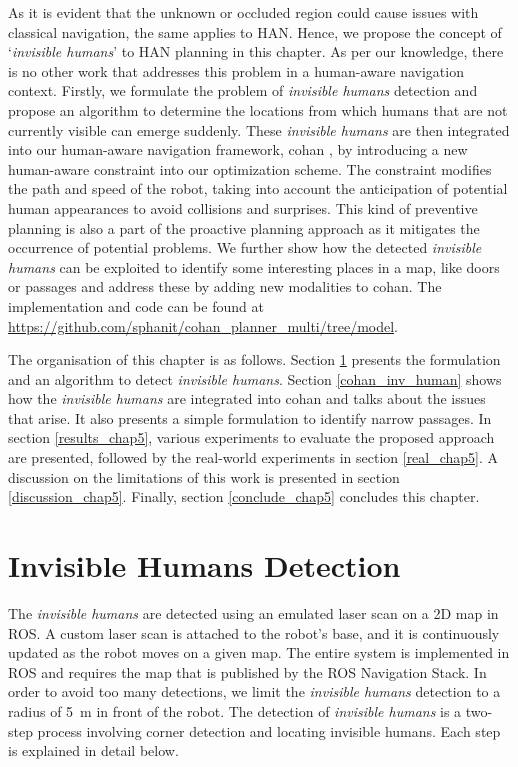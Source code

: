 As it is evident that the unknown or occluded region could cause issues with classical navigation, the same applies to HAN. Hence, we propose the concept of `\textit{invisible humans}' to HAN planning in this chapter. As per our knowledge, there is no other work that addresses this problem in a human-aware navigation context. Firstly, we formulate the problem of \textit{invisible humans} detection and propose an algorithm to determine the locations from which humans that are not currently visible can emerge suddenly. These \textit{invisible humans} are then integrated into our human-aware navigation framework, \acrshort{cohan} \cite{singamaneni2021human}, by introducing a new human-aware constraint into our optimization scheme. The constraint modifies the path and speed of the robot, taking into account the anticipation of potential human appearances to avoid collisions and surprises. This kind of preventive planning is also a part of the proactive planning approach as it mitigates the occurrence of potential problems. We further show how the detected \textit{invisible humans} can be exploited to identify some interesting places in a map, like doors or passages and address these by adding new modalities to \acrshort{cohan}. The implementation and code can be found at {\small {\url{https://github.com/sphanit/cohan_planner_multi/tree/model}}}. 

The organisation of this chapter is as follows. Section \ref{inv_human_detect} presents the formulation and an algorithm to detect \textit{invisible humans}. Section \ref{cohan_inv_human} shows how the \textit{invisible humans} are integrated into \acrshort{cohan} and talks about the issues that arise. It also presents a simple formulation to identify narrow passages. In section \ref{results_chap5}, various experiments to evaluate the proposed approach are presented, followed by the real-world experiments in section \ref{real_chap5}. A discussion on the limitations of this work is presented in section \ref{discussion_chap5}. Finally, section \ref{conclude_chap5} concludes this chapter.

\section{Invisible Humans Detection}\label{inv_human_detect}
The \textit{invisible humans} are detected using an emulated laser scan on a 2D map in ROS. A custom laser scan is attached to the robot's base, and it is continuously updated as the robot moves on a given map. The entire system is implemented in ROS \cite{quigley2009ros} and requires the map that is published by the ROS Navigation Stack. In order to avoid too many detections, we limit the \textit{invisible humans} detection to a radius of \SI{5}{\meter} in front of the robot. The detection of \textit{invisible humans} is a two-step process involving corner detection and locating invisible humans. Each step is explained in detail below.

